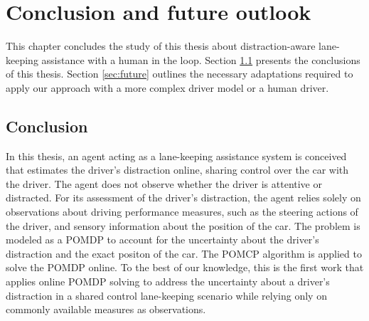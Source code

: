 \chapter{Conclusion and future outlook}
\label{ch:conclusion}

This chapter concludes the study of this thesis about distraction-aware lane-keeping assistance with a human in the loop. Section \ref{sec:conclusion} presents the conclusions of this thesis. Section \ref{sec:future} outlines the necessary adaptations required to apply our approach with a more complex driver model or a human driver.

\section{Conclusion}
\label{sec:conclusion}



In this thesis, an agent acting as a lane-keeping assistance system is conceived that estimates the driver's distraction online, sharing control over the car with the driver. The agent does not observe whether the driver is attentive or distracted. For its assessment of the driver's distraction, the agent relies solely on observations about driving performance measures, such as the steering actions of the driver, and sensory information about the position of the car. The problem is modeled as a POMDP to account for the uncertainty about the driver's distraction and the exact positon of the car. The POMCP algorithm \parencite{pomcp} is applied to solve the POMDP online. To the best of our knowledge, this is the first work that applies online POMDP solving to address the uncertainty about a driver's distraction in a shared control lane-keeping scenario while relying only on commonly available measures as observations.


